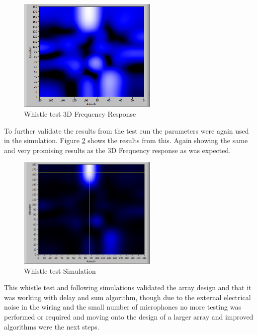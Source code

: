 \documentclass{UoNMCHA}
\numberwithin{equation}{section}
\begin{document}
    \begin{figure} [H]
        \centering
        \includegraphics[keepaspectratio, width = 0.6\textwidth]{Figures/RealWhistle3DFreqResp.png}
        \caption{Whistle test 3D Frequency Response}
        \label{fig:RealWhistleFreq}
    \end{figure}
    
    To further validate the results from the test run the parameters were again used in the simulation. Figure \ref{fig:RealWhistleSim} shows the results from this. Again showing the same and very promising results as the 3D Frequency response as was expected.
    
     \begin{figure} [H]
        \centering
        \includegraphics[keepaspectratio, width = 0.6\textwidth]{Figures/RealWhistleSim.png}
        \caption{Whistle test Simulation}
        \label{fig:RealWhistleSim}
    \end{figure}

    This whistle test and following simulations validated the array design and that it was working with delay and sum algorithm, though due to the external electrical noise in the wiring and the small number of microphones no more testing was performed or required and moving onto the design of a larger array and improved algorithms were the next steps.
    
\end{document}
